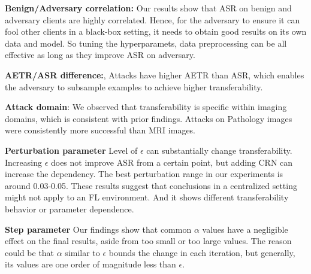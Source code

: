 \textbf{Benign/Adversary correlation:} Our results show that ASR on benign and adversary clients are highly correlated. Hence, for the adversary to ensure it can fool other clients in a black-box setting, it needs to obtain good results on its own data and model. So tuning the hyperparamets, data preprocessing can be all effective as long as they improve ASR on adversary.

\textbf{AETR/ASR difference:}, Attacks have higher AETR than ASR, which enables the adversary to subsample examples to achieve higher transferability. 

\textbf{Attack domain}: We observed that transferability is specific within imaging domains, which is consistent with prior findings.\cite{bortsova2021adversarial} Attacks on Pathology images were consistently more successful than MRI images. 

\textbf{Perturbation parameter}
Level of $\epsilon$ can substantially change transferability. Increasing $\epsilon$ does not improve ASR from a certain point, but adding CRN can increase the dependency. The best perturbation range in our experiments is around 0.03-0.05. These results suggest that conclusions in a centralized setting might not apply to an FL environment. And it shows different transferability behavior or parameter dependence.

\textbf{Step parameter } Our findings show that common $\alpha$ values have a  negligible effect on the final results, aside from too small or too large values. The reason could be that $\alpha$ similar to  $\epsilon$  bounds the change in each iteration, but generally, its values are one order of magnitude less than $\epsilon$. 


